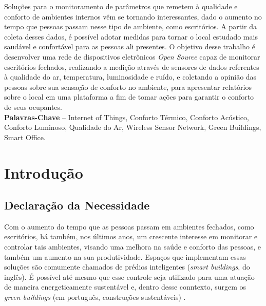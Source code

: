 \documentclass[]{politex}
\begin{document}
\capa
\folhaderosto


\begin{resumo}
Soluções para o monitoramento de parâmetros que remetem à qualidade e conforto de ambientes internos vêm se tornando interessantes, dado o aumento no tempo que pessoas passam nesse tipo de ambiente, como escritórios. A partir da coleta desses dados, é possível adotar medidas para tornar o local estudado mais saudável e confortável para as pessoas ali presentes. O objetivo desse trabalho é desenvolver uma rede de dispositivos eletrônicos \textit{Open Source} capaz de monitorar escritórios fechados, realizando a medição através de sensores de dados referentes à qualidade do ar, temperatura, luminosidade e ruído, e coletando a opinião das pessoas sobre sua sensação de conforto no ambiente, para apresentar relatórios sobre o local em uma plataforma a fim de tomar ações para garantir o conforto de seus ocupantes. 
%
\\[3\baselineskip]
%
\textbf{Palavras-Chave} -- Internet of Things, Conforto Térmico, Conforto Acústico, Conforto Luminoso, Qualidade do Ar, Wireless Sensor Network, Green Buildings, Smart Office.
\end{resumo}


\sumario


\chapter{Introdução}

\section{Declaração da Necessidade}

Com o aumento do tempo que as pessoas passam em ambientes fechados, como escritórios, há também, nos últimos anos, um crescente interesse em monitorar e controlar tais ambientes, visando uma melhora na saúde e conforto das pessoas, e também um aumento na sua produtividade. Espaços que implementam essas soluções são comumente chamados de prédios inteligentes (\textit{smart buildings}, do inglês). É possível até mesmo que esse controle seja utilizado para uma atuação de maneira energeticamente sustentável e, dentro desse conntexto, surgem os \textit{green buildings} (em português, construções sustentáveis) \cite{GreenBuildings} \cite{EnergyBuildings}.
\end{document}
